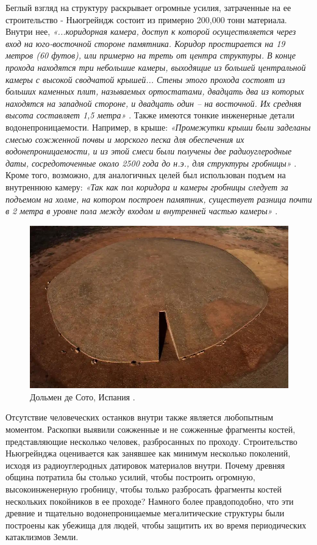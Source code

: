 \documentclass[10pt,twocolumn,letterpaper]{article}
\begin{document}
Беглый взгляд на структуру раскрывает огромные усилия, затраченные на ее строительство - Ньюгрейндж состоит из примерно 200,000 тонн материала. Внутри нее, \textit{«...коридорная камера, доступ к которой осуществляется через вход на юго-восточной стороне памятника. Коридор простирается на 19 метров (60 футов), или примерно на треть от центра структуры. В конце прохода находятся три небольшие камеры, выходящие из большей центральной камеры с высокой сводчатой крышей... Стены этого прохода состоят из больших каменных плит, называемых ортостатами, двадцать два из которых находятся на западной стороне, и двадцать один – на восточной. Их средняя высота составляет 1,5 метра»} \cite{70}. Также имеются тонкие инженерные детали водонепроницаемости. Например, в крыше: \textit{«Промежутки крыши были заделаны смесью сожженной почвы и морского песка для обеспечения их водонепроницаемости, и из этой смеси были получены две радиоуглеродные даты, сосредоточенные около 2500 года до н.э., для структуры гробницы»} \cite{71}. Кроме того, возможно, для аналогичных целей был использован подъем на внутреннюю камеру: \textit{«Так как пол коридора и камеры гробницы следует за подъемом на холме, на котором построен памятник, существует разница почти в 2 метра в уровне пола между входом и внутренней частью камеры»} \cite{71}.

\begin{figure}[b]
\begin{center}
   \includegraphics[width=1\linewidth]{dolmen.jpg}
\end{center}
   \caption{Дольмен де Сото, Испания \cite{53}.}
\label{fig:9}
\label{fig:onecol}
\end{figure}

Отсутствие человеческих останков внутри также является любопытным моментом. Раскопки выявили сожженные и не сожженные фрагменты костей, представляющие несколько человек, разбросанных по проходу. Строительство Ньюгрейнджа оценивается как занявшее как минимум несколько поколений, исходя из радиоуглеродных датировок материалов внутри. Почему древняя община потратила бы столько усилий, чтобы построить огромную, высокоинженерную гробницу, чтобы только разбросать фрагменты костей нескольких покойников в ее проходе? Намного более правдоподобно, что эти древние и тщательно водонепроницаемые мегалитические структуры были построены как убежища для людей, чтобы защитить их во время периодических катаклизмов Земли.
\end{document}
